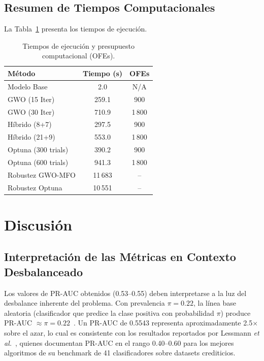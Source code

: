 \documentclass[journal]{IEEEtran}
\begin{document}
\subsection{Resumen de Tiempos Computacionales}
La Tabla~\ref{tab:times} presenta los tiempos de ejecución.

\begin{table}[!t]
\caption{Tiempos de ejecución y presupuesto computacional (OFEs).}
\label{tab:times}
\centering
\small
\begin{tabular}{lcc}
\toprule
Método & Tiempo (s) & OFEs \\
\midrule
Modelo Base & 2.0 & N/A \\
GWO (15 Iter) & 259.1 & 900 \\
GWO (30 Iter) & 710.9 & 1\,800 \\
Híbrido (8+7) & 297.5 & 900 \\
Híbrido (21+9) & 553.0 & 1\,800 \\
Optuna (300 trials) & 390.2 & 900 \\
Optuna (600 trials) & 941.3 & 1\,800 \\
Robustez GWO-MFO & 11\,683 & -- \\
Robustez Optuna & 10\,551 & -- \\
\bottomrule
\end{tabular}
\end{table}

\section{Discusión}
\label{sec:discussion}

\subsection{Interpretación de las Métricas en Contexto Desbalanceado}
Los valores de PR-AUC obtenidos (0.53--0.55) deben interpretarse a la luz del desbalance inherente del problema. Con prevalencia $\pi = 0.22$, la línea base aleatoria (clasificador que predice la clase positiva con probabilidad $\pi$) produce PR-AUC $\approx \pi = 0.22$~\cite{davis2006}. Un PR-AUC de 0.5543 representa aproximadamente 2.5$\times$ sobre el azar, lo cual es consistente con los resultados reportados por Lessmann \textit{et al.}~\cite{lessmann2015}, quienes documentan PR-AUC en el rango 0.40--0.60 para los mejores algoritmos de su benchmark de 41 clasificadores sobre datasets crediticios.
\end{document}
